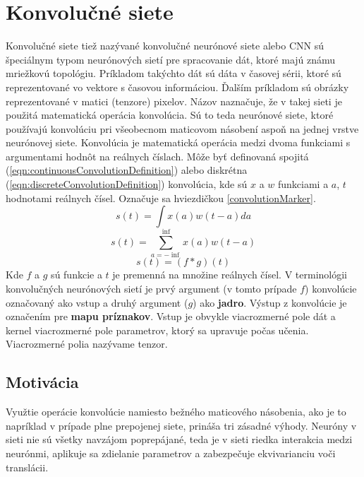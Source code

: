 \section{Konvolučné siete} \label{CNN}
Konvolučné siete \cite{Goodfellow-et-al-2016} tiež nazývané  konvolučné neurónové siete alebo CNN sú špeciálnym typom neurónových sietí pre spracovanie dát, ktoré majú známu mriežkovú topológiu. Príkladom takýchto dát sú dáta v časovej sérii, ktoré sú reprezentované vo vektore s časovou informáciou. Ďalším príkladom sú obrázky reprezentované v matici (tenzore) pixelov. Názov naznačuje, že v takej sieti je použitá matematická operácia konvolúcia. Sú to teda neurónové siete, ktoré používajú konvolúciu pri všeobecnom maticovom násobení aspoň na jednej vrstve neurónovej siete. Konvolúcia je matematická operácia medzi dvoma funkciami s argumentami hodnôt na reálnych číslach. Môže byť definovaná \cite{Goodfellow-et-al-2016} spojitá (\ref{eqn:continuousConvolutionDefinition}) alebo diskrétna (\ref{eqn:discreteConvolutionDefinition}) konvolúcia, kde sú $x$ a $w$ funkciami a $a$, $t$ hodnotami reálnych čísel. Označuje sa hviezdičkou \ref{convolutionMarker}.
\begin{equation}\label{eqn:continuousConvolutionDefinition}
    {
        s(t) = \int{x(a)w(t-a)da}
    }
\end{equation}
\begin{equation}\label{eqn:discreteConvolutionDefinition}
    {
        s(t) = \sum_{a=-\inf}^{\inf}{x(a)w(t-a)}
    }
\end{equation}
\begin{equation}\label{convolutionMarker}
    {s(t) = (f*g)(t)}
\end{equation}
Kde $f$ a $g$ sú funkcie a $t$ je premenná na množine reálnych čísel. V terminológii konvolučných neurónových sietí je prvý argument (v tomto prípade $f$) konvolúcie označovaný ako vstup a druhý argument ($g$) ako {\bf jadro}. Výstup z konvolúcie je označením pre {\bf mapu príznakov}. Vstup je obvykle viacrozmerné pole dát a kernel viacrozmerné pole parametrov, ktorý sa upravuje počas učenia. Viacrozmerné polia nazývame tenzor.

  \subsection{Motivácia}
Využtie operácie konvolúcie namiesto bežného maticového násobenia, ako je to napríklad v prípade plne prepojenej siete, prináša tri zásadné výhody. Neuróny v sieti nie sú všetky navzájom poprepájané, teda je v sieti riedka interakcia medzi neurónmi, aplikuje sa zdielanie parametrov a zabezpečuje ekvivarianciu voči translácii.

